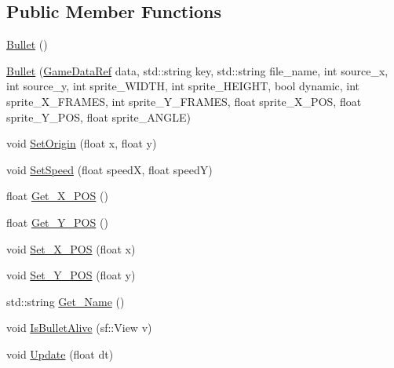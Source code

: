 \subsection*{Public Member Functions}
\begin{DoxyCompactItemize}
\item 
\hyperlink{classSekander_1_1Bullet_aa01f203963a28b68470ad288d1fd37f7}{Bullet} ()
\item 
\hyperlink{classSekander_1_1Bullet_a003f538d802703d9a85898f4c7c9aabd}{Bullet} (\hyperlink{namespaceSekander_a1d69b002ba2d23020901c28f0def5e16}{Game\+Data\+Ref} data, std\+::string key, std\+::string file\+\_\+name, int source\+\_\+x, int source\+\_\+y, int sprite\+\_\+\+W\+I\+D\+TH, int sprite\+\_\+\+H\+E\+I\+G\+HT, bool dynamic, int sprite\+\_\+\+X\+\_\+\+F\+R\+A\+M\+ES, int sprite\+\_\+\+Y\+\_\+\+F\+R\+A\+M\+ES, float sprite\+\_\+\+X\+\_\+\+P\+OS, float sprite\+\_\+\+Y\+\_\+\+P\+OS, float sprite\+\_\+\+A\+N\+G\+LE)
\item 
void \hyperlink{classSekander_1_1Bullet_a7b55b501f075c0e647e36d9027c5a6e0}{Set\+Origin} (float x, float y)
\item 
void \hyperlink{classSekander_1_1Bullet_ad44291d034b112d561ec65d9b57b3fe6}{Set\+Speed} (float speedX, float speedY)
\item 
float \hyperlink{classSekander_1_1Bullet_a149639cae1ad1f688a3ba3fcef0b3985}{Get\+\_\+\+X\+\_\+\+P\+OS} ()
\item 
float \hyperlink{classSekander_1_1Bullet_a2ba3aa653350110aad9552b3b7b9d4a5}{Get\+\_\+\+Y\+\_\+\+P\+OS} ()
\item 
void \hyperlink{classSekander_1_1Bullet_af301fa12205fe6c3068fffde3a79168f}{Set\+\_\+\+X\+\_\+\+P\+OS} (float x)
\item 
void \hyperlink{classSekander_1_1Bullet_a463b5aa21e128bd022c38989cef6280b}{Set\+\_\+\+Y\+\_\+\+P\+OS} (float y)
\item 
std\+::string \hyperlink{classSekander_1_1Bullet_a0014d85f72f42816b9e095c4d2fe8199}{Get\+\_\+\+Name} ()
\item 
void \hyperlink{classSekander_1_1Bullet_a12294c6407f43a86cf9d937e54554712}{Is\+Bullet\+Alive} (sf\+::\+View v)
\item 
void \hyperlink{classSekander_1_1Bullet_addf91b40d0c5f045226f853615079ac0}{Update} (float dt)
\end{DoxyCompactItemize}
